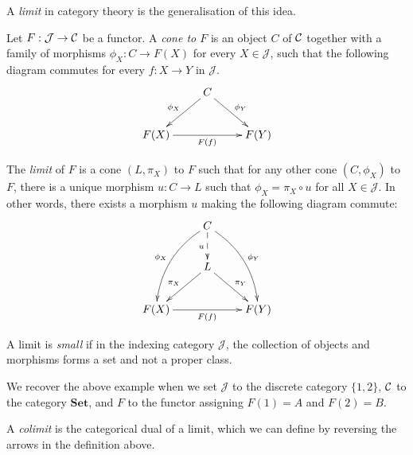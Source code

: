 A \emph{limit} in category theory is the generalisation of this idea.

\begin{definition}
Let $F : \mathcal{J} \to \mathcal{C}$ be a functor. A \emph{cone to $F$} is an object $C$ of $\mathcal{C}$ together with a family of morphisms $\phi_X : C \to F(X)$ for every $X \in \mathcal{J}$, such that the following diagram commutes for every $f : X \to Y$ in $\mathcal{J}$.
\begin{displaymath}
\xymatrix{
& C \ar[dl]_{\phi_X} \ar[dr]^{\phi_Y}  & \\
F(X) \ar[rr]_{F(f)} & & F(Y)
}
\end{displaymath}

The \emph{limit} of $F$ is a cone $(L, \pi_X)$ to $F$ such that for any other cone $(C, \phi_X)$ to $F$, there is a unique morphism $u : C \to L$ such that $\phi_X = \pi_X \circ u$ for all $X \in \mathcal{J}$. In other words, there exists a morphism $u$ making the following diagram commute:
\begin{displaymath}
\xymatrix{
& C \ar@/_1pc/[ddl]_{\phi_X} \ar@/^1pc/[ddr]^{\phi_Y} \ar@{-->}[d]_u & \\
& L \ar[dl]_{\pi_X} \ar[dr]^{\pi_Y} & \\
F(X) \ar[rr]_{F(f)} &  & F(Y)
}
\end{displaymath}

A limit is \emph{small} if in the indexing category $\mathcal{J}$, the collection of objects and morphisms forms a set and not a proper class.
\end{definition}

We recover the above example when we set $\mathcal{J}$ to the discrete category $\{1, 2\}$, $\mathcal{C}$ to the category $\mathbf{Set}$, and $F$ to the functor assigning $F(1) = A$ and $F(2) = B$.

A \emph{colimit} is the categorical dual of a limit, which we can define by reversing the arrows in the definition above.

